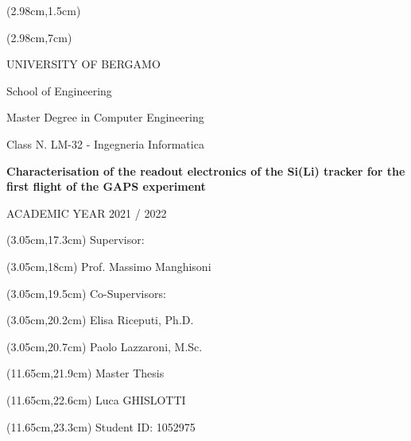 \thispagestyle{empty}
\begin{textblock*}{\textwidth}(2.98cm,1.5cm)
    \begin{center}
        \vskip0.5cm
          
    \end{center}
\end{textblock*}

\begin{textblock*}{\textwidth}(2.98cm,7cm)
    \begin{center}
        \large
        UNIVERSITY OF BERGAMO
    \end{center}
    \begin{center}
        School of Engineering
    \end{center}
    \vspace{-0.65cm}
    \begin{center}
        Master Degree in Computer Engineering
    \end{center}
    \vspace{-0.65cm}
    \begin{center}
        Class N. LM-32 - Ingegneria Informatica
    \end{center}
    \vspace{1cm}
    \begin{center}
        \LARGE
        \textbf{Characterisation of the readout electronics of the Si(Li) tracker for the first flight of the GAPS experiment}
    \end{center}
    \vspace{10.5cm}
    \begin{center}
         ACADEMIC YEAR 2021 / 2022
    \end{center}
\end{textblock*}

\begin{textblock*}{\textwidth}(3.05cm,17.3cm) 
    Supervisor:
\end{textblock*}
\begin{textblock*}{\textwidth}(3.05cm,18cm)
    Prof. Massimo Manghisoni
\end{textblock*}

\begin{textblock*}{\textwidth}(3.05cm,19.5cm)
    Co-Supervisors:
\end{textblock*}
\begin{textblock*}{\textwidth}(3.05cm,20.2cm)
    Elisa Riceputi, Ph.D.
\end{textblock*}
\begin{textblock*}{\textwidth}(3.05cm,20.7cm) 
    Paolo Lazzaroni, M.Sc.
\end{textblock*}

\begin{textblock*}{\textwidth}(11.65cm,21.9cm)
    Master Thesis
\end{textblock*}
\begin{textblock*}{\textwidth}(11.65cm,22.6cm)
    Luca GHISLOTTI
\end{textblock*}
\begin{textblock*}{\textwidth}(11.65cm,23.3cm) 
    Student ID: 1052975
\end{textblock*}